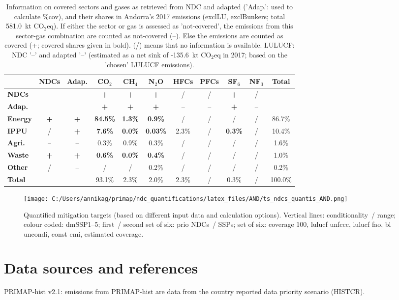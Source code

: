 \documentclass[12pt]{article}
\begin{document}
 \begin{table}[htbp]\small
 \centering
 \caption{Information on covered sectors and gases as retrieved from NDC and adapted ('Adap.': used to calculate \%cov), and their shares in Andorra's 2017 emissions (exclLU, exclBunkers; total 581.0~kt CO$_2$eq).
 If either the sector or gas is assessed as 'not-covered', the emissions from this sector-gas combination are counted as not-covered (--). 
 Else the emissions are counted as covered (+; covered shares given in bold).
 (/) means that no information is available.
 LULUCF: NDC '--' and adapted '--' (estimated as a net sink of -135.6~kt CO$_2$eq in 2017; based on the 'chosen' LULUCF emissions).}
 \label{tab:coveredSectorsGases}
 \begin{tabular}{l || c c || c c c c c c c | c}
 \bfseries  & \bfseries NDCs & \bfseries Adap. & \bfseries CO$_2$ & \bfseries CH$_4$ & \bfseries N$_2$O & \bfseries HFCs & \bfseries PFCs & \bfseries SF$_6$ & \bfseries NF$_3$ & \bfseries Total \tabularnewline \hline \hline
 \bfseries NDCs &  &  & \bfseries + & \bfseries + & \bfseries + & / & / & \bfseries + & / &  \tabularnewline 
 \bfseries Adap. &  &  & \bfseries + & \bfseries + & \bfseries + & -- & -- & \bfseries + & -- &  \tabularnewline \hline \hline
 \bfseries Energy & \bfseries + & \bfseries + & \bfseries 84.5\% & \bfseries 1.3\% & \bfseries 0.9\% & / & / & / & / & 86.7\% \tabularnewline 
 \bfseries IPPU & / & \bfseries + & \bfseries 7.6\% & \bfseries 0.0\% & \bfseries 0.03\% & 2.3\% & / & \bfseries 0.3\% & / & 10.4\% \tabularnewline 
 \bfseries Agri. & -- & -- & 0.3\% & 0.9\% & 0.3\% & / & / & / & / & 1.6\% \tabularnewline 
 \bfseries Waste & \bfseries + & \bfseries + & \bfseries 0.6\% & \bfseries 0.0\% & \bfseries 0.4\% & / & / & / & / & 1.0\% \tabularnewline 
 \bfseries Other & / & -- & / & / & 0.2\% & / & / & / & / & 0.2\% \tabularnewline \hline
 \bfseries Total &  &  & 93.1\% & 2.3\% & 2.0\% & 2.3\% & / & 0.3\% & / & 100.0\% \tabularnewline 
 \end{tabular}
 \end{table}
 \begin{figure}[htbp]
 \centering
 \texttt{[image: C:/Users/annikag/primap/ndc\_quantifications/latex\_files/AND/ts\_ndcs\_quantis\_AND.png]}
 \caption{Quantified mitigation targets (based on different input data and calculation options).
 Vertical lines: conditionality~/ range;
 colour coded: dmSSP1--5;
 first~/ second set of six: prio NDCs~/ SSPs;
 set of six: coverage 100, lulucf unfccc, lulucf fao, bl uncondi, const emi, estimated coverage.}
 \label{fig:miti}
 \end{figure}

 \section{Data sources and references}
 \label{sec:dataSourcesRefs}
 PRIMAP-hist v2.1: emissions from PRIMAP-hist are data from the country reported data priority scenario (HISTCR).

 
\end{document}
